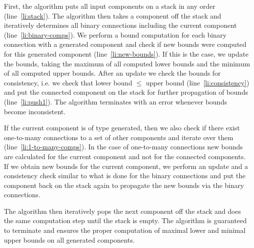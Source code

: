 \documentclass[copyright,creativecommons]{eptcs}
\begin{document}
First, the algorithm puts all input components on a stack in any order (line~\ref{li:stack}). 
The algorithm then takes a component off the stack and iteratively determines all binary connections including the current component (line~\ref{li:binary-comps}). 
We perform a bound computation for each binary connection with a generated component and check if new bounds were computed for this generated component (line~\ref{li:new-bounds}). 
If this is the case, we update the bounds, taking the maximum of all computed lower bounds and the minimum of all computed upper bounds. 
After an update we check the bounds for consistency, i.e. we check that lower bound $\leq$ upper bound (line~\ref{li:consistency}) 
and put the connected component on the stack for further propagation of bounds (line~\ref{li:push1}). 
The algorithm terminates with an error whenever bounds become inconsistent. 

If the current component is of type generated, then we also check if there exist one-to-many connections to a set of other components and 
iterate over them (line~\ref{li:1-to-many-comps}). 
In the case of one-to-many connections new bounds are calculated for the current component and not for the connected components. 
If we obtain new bounds for the current component, we perform an update and a consistency check similar to what is done for the binary connections 
and put the component back on the stack again to propagate the new bounds via the binary connections. 

The algorithm then iteratively pops the next component off the stack and does the same computation step until the stack is empty. 
The algorithm is guaranteed to terminate and ensures the proper computation of maximal lower and minimal upper bounds on all generated components. 
\end{document}
